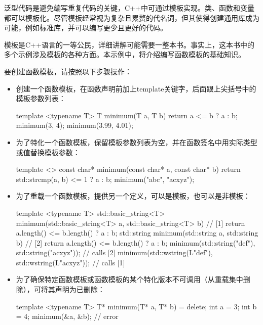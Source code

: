 
泛型代码是避免编写重复代码的关键，C++中可通过模板实现。类、函数和变量都可以模板化。尽管模板经常视为复杂且累赘的代名词，但其使得创建通用库成为可能，例如标准库，并可以编写更少且更好的代码。

模板是C++语言的一等公民，详细讲解可能需要一整本书。事实上，这本书中的多个示例涉及模板的各种方面。本示例中，将介绍编写函数模板的基础知识。


要创建函数模板，请按照以下步骤操作：

\begin{itemize}
\item
创建一个函数模板，在函数声明前加上template关键字，后面跟上尖括号中的模板参数列表：

\begin{cpp}
template <typename T>
T minimum(T a, T b)
{
    return a <= b ? a : b;
}
minimum(3, 4);
minimum(3.99, 4.01);
\end{cpp}

\item
为了特化一个函数模板，保留模板参数列表为空，并在函数签名中用实际类型或值替换模板参数：

\begin{cpp}
template <>
const char* minimum(const char* a, const char* b)
{
    return std::strcmp(a, b) <= 1 ? a : b;
}
minimum("abc", "acxyz");
\end{cpp}

\item
为了重载一个函数模板，提供另一个定义，可以是模板，也可以是非模板：

\begin{cpp}
template <typename T>
std::basic_string<T> minimum(std::basic_string<T> a,
std::basic_string<T> b) // [1]
{
    return a.length() <= b.length() ? a : b;
}
std::string minimum(std::string a, std::string b) // [2]
{
    return a.length() <= b.length() ? a : b;
}
minimum(std::string("def"), std::string("acxyz")); // calls [2]
minimum(std::wstring(L"def"), std::wstring(L"acxyz")); // calls [1]
\end{cpp}

\item
为了确保特定函数模板或函数模板的某个特化版本不可调用（从重载集中删除），可将其声明为已删除：

\begin{cpp}
template <typename T>
T* minimum(T* a, T* b) = delete;
int a = 3;
int b = 4;
minimum(&a, &b); // error
\end{cpp}
\end{itemize}

